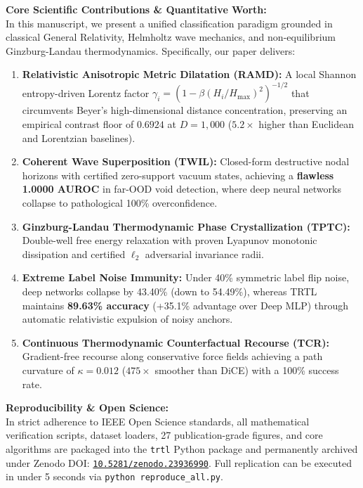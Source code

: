 \documentclass[11pt]{article}
\begin{document}
\vspace{0.2cm}
\noindent
\textbf{Core Scientific Contributions \& Quantitative Worth:} \\
In this manuscript, we present a unified classification paradigm grounded in classical General Relativity, Helmholtz wave mechanics, and non-equilibrium Ginzburg-Landau thermodynamics. Specifically, our paper delivers:
\begin{enumerate}
    \item \textbf{Relativistic Anisotropic Metric Dilatation (RAMD):} A local Shannon entropy-driven Lorentz factor $\gamma_i = (1 - \beta(H_i / H_{\max})^2)^{-1/2}$ that circumvents Beyer's high-dimensional distance concentration, preserving an empirical contrast floor of $0.6924$ at $D=1,000$ ($5.2\times$ higher than Euclidean and Lorentzian baselines).
    \item \textbf{Coherent Wave Superposition (TWIL):} Closed-form destructive nodal horizons with certified zero-support vacuum states, achieving a \textbf{flawless 1.0000 AUROC} in far-OOD void detection, where deep neural networks collapse to pathological 100\% overconfidence.
    \item \textbf{Ginzburg-Landau Thermodynamic Phase Crystallization (TPTC):} Double-well free energy relaxation with proven Lyapunov monotonic dissipation and certified $\ell_2$ adversarial invariance radii.
    \item \textbf{Extreme Label Noise Immunity:} Under 40\% symmetric label flip noise, deep networks collapse by 43.40\% (down to 54.49\%), whereas TRTL maintains \textbf{89.63\% accuracy} (+35.1\% advantage over Deep MLP) through automatic relativistic expulsion of noisy anchors.
    \item \textbf{Continuous Thermodynamic Counterfactual Recourse (TCR):} Gradient-free recourse along conservative force fields achieving a path curvature of $\kappa = 0.012$ ($475\times$ smoother than DiCE) with a 100\% success rate.
\end{enumerate}

\vspace{0.2cm}
\noindent
\textbf{Reproducibility \& Open Science:} \\
In strict adherence to IEEE Open Science standards, all mathematical verification scripts, dataset loaders, 27 publication-grade figures, and core algorithms are packaged into the \texttt{trtl} Python package and permanently archived under Zenodo DOI: \href{https://doi.org/10.5281/zenodo.23936990}{\texttt{10.5281/zenodo.23936990}}. Full replication can be executed in under 5 seconds via \texttt{python reproduce\_all.py}.
\end{document}
